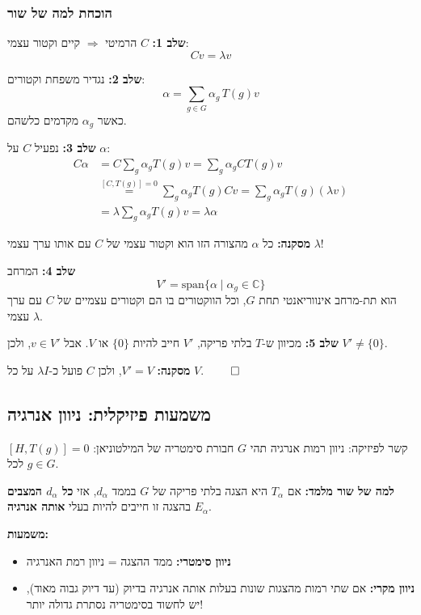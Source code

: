 \subsubsection{הוכחת למה של שור}

\textbf{שלב 1:} $C$ הרמיטי $\Rightarrow$ קיים וקטור עצמי:
\[
Cv = \lambda v
\]

\textbf{שלב 2:} נגדיר משפחת וקטורים:
\[
\alpha = \sum_{g \in G} \alpha_g \, T(g) v
\]
כאשר $\alpha_g$ מקדמים כלשהם.

\textbf{שלב 3:} נפעיל $C$ על $\alpha$:
\begin{align*}
C \alpha &= C \sum_g \alpha_g T(g) v = \sum_g \alpha_g C T(g) v \\
&\stackrel{[C,T(g)]=0}{=} \sum_g \alpha_g T(g) C v = \sum_g \alpha_g T(g) (\lambda v) \\
&= \lambda \sum_g \alpha_g T(g) v = \lambda \alpha
\end{align*}

\textbf{מסקנה:} כל $\alpha$ מהצורה הזו הוא וקטור עצמי של $C$ עם אותו ערך עצמי $\lambda$!

\textbf{שלב 4:} המרחב
\[
V' = \text{span}\{\alpha \mid \alpha_g \in \mathbb{C}\}
\]
הוא תת-מרחב אינווריאנטי תחת $G$, וכל הווקטורים בו הם וקטורים עצמיים של $C$ עם ערך עצמי $\lambda$.

\textbf{שלב 5:} מכיוון ש-$T$ בלתי פריקה, $V'$ חייב להיות $\{0\}$ או $V$. אבל $v \in V'$, ולכן $V' \neq \{0\}$.

\textbf{מסקנה:} $V' = V$, ולכן $C$ פועל כ-$\lambda I$ על כל $V$. $\qed$

\subsection{משמעות פיזיקלית: ניוון אנרגיה}

\begin{importantbox}{קשר לפיזיקה: ניוון רמות אנרגיה}
תהי $G$ חבורת סימטריה של המילטוניאן: $[H, T(g)] = 0$ לכל $g \in G$.

\textbf{למה של שור מלמד:} אם $T_\alpha$ היא הצגה בלתי פריקה של $G$ בממד $d_\alpha$, אזי \textbf{כל $d_\alpha$ המצבים} בהצגה זו חייבים להיות בעלי \textbf{אותה אנרגיה} $E_\alpha$.

\textbf{משמעות:}
\begin{itemize}
    \item \textbf{ניוון סימטרי:} ממד ההצגה = ניוון רמת האנרגיה
    \item \textbf{ניוון מקרי:} אם שתי רמות מהצגות שונות בעלות אותה אנרגיה בדיוק (עד דיוק גבוה מאוד), יש לחשוד בסימטריה נסתרת גדולה יותר!
\end{itemize}
\end{importantbox}


